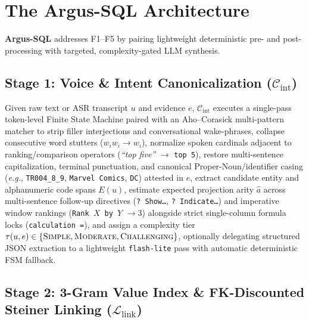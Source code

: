 \documentclass[10pt,twocolumn]{article}
\begin{document}
\section{The Argus-SQL Architecture}
\label{sec:architecture}

\textbf{Argus-SQL} addresses F1--F5 by pairing lightweight deterministic pre- and post-processing with targeted, complexity-gated LLM synthesis.

\subsection{Stage 1: Voice \& Intent Canonicalization (\texorpdfstring{$\mathcal{C}_{\text{int}}$}{C\_int})}
Given raw text or ASR transcript $u$ and evidence $e$, $\mathcal{C}_{\text{int}}$ executes a single-pass token-level Finite State Machine paired with an Aho--Corasick multi-pattern matcher to strip filler interjections and conversational wake-phrases, collapse consecutive word stutters ($w_i w_i \to w_i$), normalize spoken cardinals adjacent to ranking/comparison operators (\emph{``top five''} $\to$ \texttt{top 5}), restore multi-sentence capitalization, terminal punctuation, and canonical Proper-Noun/identifier casing (\emph{e.g.}, \texttt{TR004\_8\_9}, \texttt{Marvel Comics}, \texttt{DC}) attested in $e$, extract candidate entity and alphanumeric code spans $E(u)$, estimate expected projection arity $\hat{a}$ across multi-sentence follow-up directives (\texttt{? Show\dots}, \texttt{? Indicate\dots}) and imperative window rankings (\texttt{Rank $X$ by $Y$} $\to 3$) alongside strict single-column formula locks (\texttt{calculation =}), and assign a complexity tier $\tau(u,e) \in \{\textsc{Simple}, \textsc{Moderate}, \textsc{Challenging}\}$, optionally delegating structured JSON extraction to a lightweight \texttt{flash-lite} pass with automatic deterministic FSM fallback.

\subsection{Stage 2: 3-Gram Value Index \& FK-Discounted Steiner Linking (\texorpdfstring{$\mathcal{L}_{\text{link}}$}{L\_link})}
\label{sec:linking}
\end{document}
